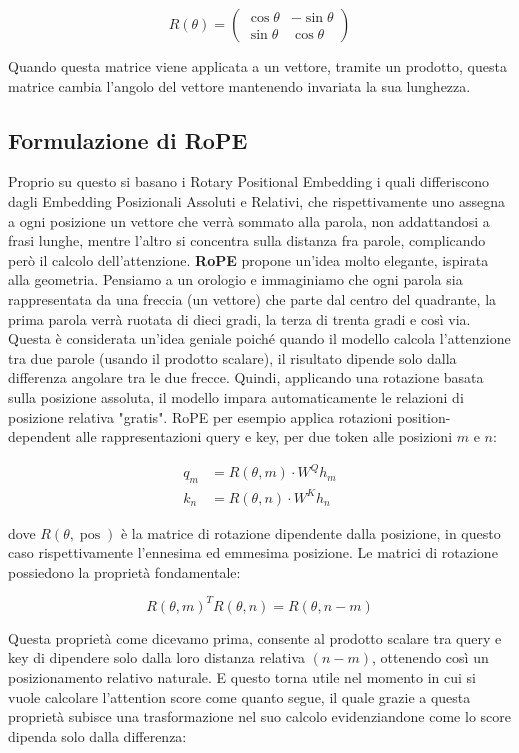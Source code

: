 \begin{equation}
    R(\theta) = \begin{pmatrix}
    \cos\theta & -\sin\theta \\
    \sin\theta & \cos\theta
    \end{pmatrix}
\end{equation}

Quando questa matrice viene applicata a un vettore, tramite un prodotto, questa matrice cambia l'angolo del vettore mantenendo invariata la sua lunghezza.

\subsection{Formulazione di RoPE}
Proprio su questo si basano i Rotary Positional Embedding i quali differiscono dagli Embedding Posizionali Assoluti e Relativi, che rispettivamente uno assegna a ogni posizione un vettore che verrà sommato alla parola, non addattandosi a frasi lunghe, mentre l'altro si concentra sulla distanza fra parole, complicando però il calcolo dell'attenzione. \textbf{RoPE} propone un'idea molto elegante, ispirata alla geometria. Pensiamo a un orologio e immaginiamo che ogni parola sia rappresentata da una freccia (un vettore) che parte dal centro del quadrante, la prima parola verrà ruotata di dieci gradi, la terza di trenta gradi e così via. Questa è considerata un'idea geniale poiché quando il modello calcola l'attenzione tra due parole (usando il prodotto scalare), il risultato dipende solo dalla differenza angolare tra le due frecce. Quindi, applicando una rotazione basata sulla posizione assoluta, il modello impara automaticamente le relazioni di posizione relativa "gratis". RoPE per esempio applica rotazioni position-dependent alle rappresentazioni query e key, per due token alle posizioni $m$ e $n$:

\begin{align*}
    q_m &= R(\theta, m) \cdot W^Q h_m \\
    k_n &= R(\theta, n) \cdot W^K h_n
\end{align*}

dove $R(\theta, \operatorname{pos})$ è la matrice di rotazione dipendente dalla posizione, in questo caso rispettivamente l'ennesima ed emmesima posizione. Le matrici di rotazione possiedono la proprietà fondamentale:

\[
    R(\theta, m)^T R(\theta, n) = R(\theta, n-m)
\]

Questa proprietà come dicevamo prima, consente al prodotto scalare tra query e key di dipendere solo dalla loro distanza relativa $(n-m)$, ottenendo così un posizionamento relativo naturale. E questo torna utile nel momento in cui si vuole calcolare l'attention score come quanto segue, il quale grazie a questa proprietà subisce una trasformazione nel suo calcolo evidenziandone come lo score dipenda solo dalla differenza:

